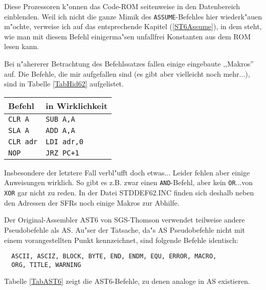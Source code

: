 \documentclass[12pt,a4paper,twoside]{report}
\newcommand{\tty}[1]{{\tt #1}}
\begin{document}
Diese Prozessoren k"onnen das Code-ROM seitenweise in den Datenbereich
einblenden.  Weil ich nicht die ganze Mimik des \tty{ASSUME}-Befehles
hier wiederk"auen m"ochte, verweise ich auf das entsprechende Kapitel
(\ref{ST6Assume}), in dem steht, wie man mit diesem Befehl einigerma"sen
unfallfrei Konstanten aus dem ROM lesen kann.
\par
Bei n"ahererer Betrachtung des Befehlssatzes fallen einige eingebaute
,,Makros'' auf.  Die Befehle, die mir aufgefallen sind (es gibt aber
vielleicht noch mehr...), sind in Tabelle \ref{TabHid62} aufgelistet.
\par
\begin{table*}[htbp]
\begin{center}\begin{tabular}{|l|l|}
\hline
Befehl   & in Wirklichkeit \\
\hline
\hline
\tty{CLR A}    & \tty{SUB A,A} \\
\tty{SLA A}    & \tty{ADD A,A} \\
\tty{CLR adr}  & \tty{LDI adr,0} \\
\tty{NOP}      & \tty{JRZ PC+1} \\
\hline
\end{tabular}\end{center}
\caption{versteckte Makros im ST6225-Befehlssatz\label{TabHid62}}
\end{table*}
Insbesondere der letztere Fall verbl"ufft doch etwas...
Leider fehlen aber einige Anweisungen wirklich.  So gibt es z.B. zwar einen
\tty{AND}-Befehl, aber kein \tty{OR}...von \tty{XOR} gar nicht zu
reden.  In der Datei  STDDEF62.INC finden sich deshalb neben den Adressen
der SFRs noch einige Makros zur Abhilfe.
\par
Der Original-Assembler AST6 von SGS-Thomson verwendet teilweise andere
Pseudobefehle als AS.  Au"ser der Tatsache, da"s AS Pseudobefehle nicht
mit einem vorangestellten Punkt kennzeichnet, sind folgende Befehle
identisch:
\begin{verbatim}
  ASCII, ASCIZ, BLOCK, BYTE, END, ENDM, EQU, ERROR, MACRO,
  ORG, TITLE, WARNING
\end{verbatim}
Tabelle \ref{TabAST6} zeigt die AST6-Befehle, zu denen analoge in AS
existieren.
\par
\end{document}
